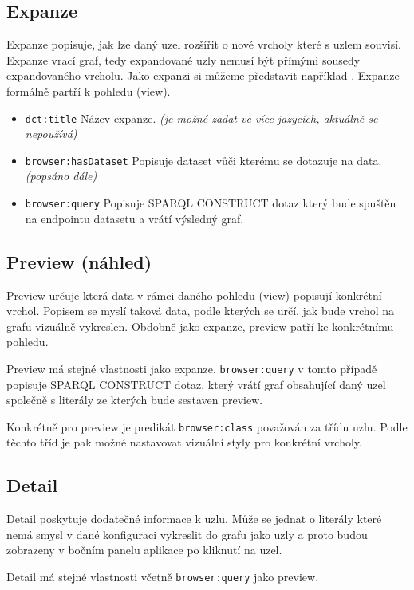 \subsection{Expanze} \label{pozadavky-expansion}
Expanze popisuje, jak lze daný uzel rozšířit o nové vrcholy které s uzlem souvisí. Expanze vrací graf, tedy expandované uzly nemusí být přímými sousedy expandovaného vrcholu. Jako expanzi si můžeme představit například . Expanze formálně partří k pohledu (view).
\begin{itemize}
    \item \texttt{dct:title} Název expanze. \textit{(je možné zadat ve více jazycích, aktuálně se nepoužívá)}
    \item \texttt{browser:hasDataset} Popisuje dataset vůči kterému se dotazuje na data. \textit{(popsáno dále)}
    \item \texttt{browser:query} Popisuje SPARQL CONSTRUCT dotaz který bude spuštěn na endpointu datasetu a vrátí výsledný graf.
\end{itemize}

\subsection{Preview (náhled)} \label{pozadavky-preview}
Preview určuje která data v rámci daného pohledu (view) popisují konkrétní vrchol. Popisem se myslí taková data, podle kterých se určí, jak bude vrchol na grafu vizuálně vykreslen. Obdobně jako expanze, preview patří ke konkrétnímu pohledu.

Preview má stejné vlastnosti jako expanze. \texttt{browser:query} v tomto případě popisuje SPARQL CONSTRUCT dotaz, který vrátí graf obsahující daný uzel společně s literály ze kterých bude sestaven preview.

Konkrétně pro preview je predikát \texttt{browser:class} považován za třídu uzlu. Podle těchto tříd je pak možné nastavovat vizuální styly pro konkrétní vrcholy.

\subsection{Detail} \label{pozadavky-detail}
Detail poskytuje dodatečné informace k uzlu. Může se jednat o literály které nemá smysl v dané konfiguraci vykreslit do grafu jako uzly a proto budou zobrazeny v bočním panelu aplikace po kliknutí na uzel.

Detail má stejné vlastnosti včetně \texttt{browser:query} jako preview.

